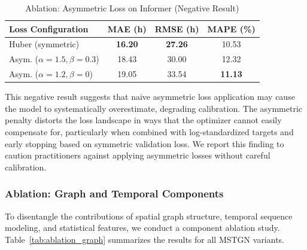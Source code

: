 \documentclass[conference]{IEEEtran}
\begin{document}
\begin{table}[t]
    \centering
    \caption{Ablation: Asymmetric Loss on Informer (Negative Result)}
    \label{tab:ablation_loss}
    \begin{tabular}{lccc}
        \toprule
        \textbf{Loss Configuration} & \textbf{MAE (h)} & \textbf{RMSE (h)} & \textbf{MAPE (\%)} \\
        \midrule
        Huber (symmetric) & \textbf{16.20} & \textbf{27.26} & 10.53 \\
        Asym. ($\alpha{=}1.5, \beta{=}0.3$) & 18.43 & 30.00 & 12.32 \\
        Asym. ($\alpha{=}1.2, \beta{=}0$) & 19.05 & 33.54 & \textbf{11.13} \\
        \bottomrule
    \end{tabular}
\end{table}

This negative result suggests that naive asymmetric loss application may cause the model to systematically overestimate, degrading calibration.
The asymmetric penalty distorts the loss landscape in ways that the optimizer cannot easily compensate for, particularly when combined with log-standardized targets and early stopping based on symmetric validation loss.
We report this finding to caution practitioners against applying asymmetric losses without careful calibration.


\subsubsection{Ablation: Graph and Temporal Components}
\label{sec:graph_ablation}

To disentangle the contributions of spatial graph structure, temporal sequence modeling, and statistical features, we conduct a component ablation study.
Table~\ref{tab:ablation_graph} summarizes the results for all MSTGN variants.
\end{document}
